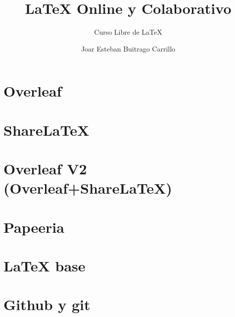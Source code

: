 \documentclass[12pt,aspectratio=43]{beamer}
\title{{\lmr\LaTeX} Online y Colaborativo}
\subtitle{Curso Libre de {\lmr\LaTeX}}
\author{Joar Esteban Buitrago Carrillo}
\institute{Universidad Nacional de Colombia}
\date{}
\makeatletter
\newcommand{\ifratio}[2]{
	\ifthenelse
	{\lengthtest{\beamer@paperwidth=16cm} \AND \lengthtest{\beamer@paperheight=9cm}}
	{#1}
	{#2} }
\makeatother
\begin{document}
\begin{frame}[plain]
\titlepage
\end{frame}

{
\begin{frame}
\ifratio
	{}
	{}
\end{frame}
}

\section{Overleaf}

\section{ShareLaTeX}

\section{Overleaf V2 (Overleaf+ShareLaTeX)}

\section{Papeeria}

\section{LaTeX base}

\section{Github y git}
\end{document}
